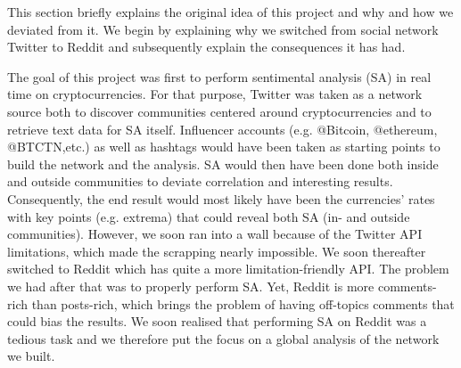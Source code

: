 This section briefly explains the original idea of this project and why and how we deviated from it. We begin by explaining why we switched from social network Twitter to Reddit and subsequently explain the consequences it has had.

The goal of this project was first to perform sentimental analysis (SA) in real time on cryptocurrencies. For that purpose, Twitter was taken as a network source both to discover communities centered around cryptocurrencies and to retrieve text data for SA itself. Influencer accounts (e.g. @Bitcoin, @ethereum, @BTCTN,etc.) as well as hashtags would have been taken as starting points to build the network and the analysis. SA would then have been done both inside and outside communities to deviate correlation and interesting results. Consequently, the end result would most likely have been the currencies' rates with key points (e.g. extrema) that could reveal both SA (in- and outside communities). However, we soon ran into a wall because of the Twitter API limitations, which made the scrapping nearly impossible. We soon thereafter switched to Reddit which has quite a more limitation-friendly API. The problem we had after that was to properly perform SA. Yet, Reddit is more comments-rich than posts-rich, which brings the problem of having off-topics comments that could bias the results. We soon realised that performing SA on Reddit was a tedious task and we therefore put the focus on a global analysis of the network we built.
